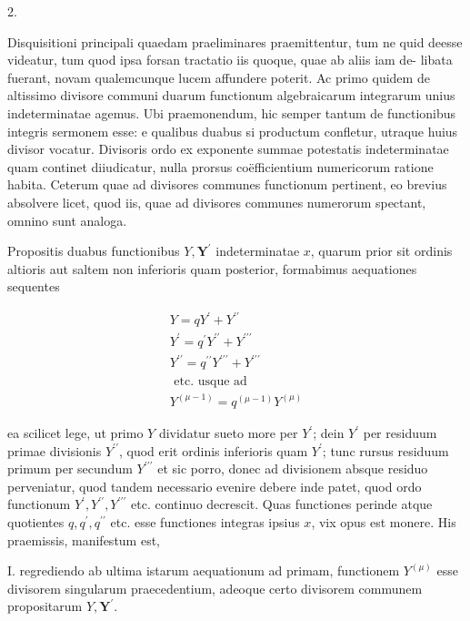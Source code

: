 \documentclass[10pt]{article}
\begin{document}
2.

Disquisitioni principali quaedam praeliminares praemittentur, tum ne quid deesse videatur, tum quod ipsa forsan tractatio iis quoque, quae ab aliis iam de-
libata fuerant, novam qualemcunque lucem affundere poterit. Ac primo quidem de altissimo divisore communi duarum functionum algebraicarum integrarum unius indeterminatae agemus. Ubi praemonendum, hic semper tantum de functionibus integris sermonem esse: e qualibus duabus si productum confletur, utraque huius divisor vocatur. Divisoris ordo ex exponente summae potestatis indeterminatae quam continet diiudicatur, nulla prorsus coëfficientium numericorum ratione habita. Ceterum quae ad divisores communes functionum pertinent, eo brevius absolvere licet, quod iis, quae ad divisores communes numerorum spectant, omnino sunt analoga.

Propositis duabus functionibus \(Y, \boldsymbol{Y}^{\prime}\) indeterminatae \(x\), quarum prior sit ordinis altioris aut saltem non inferioris quam posterior, formabimus aequationes sequentes

\[
\begin{gathered}
Y=q Y^{\prime}+Y^{\prime \prime} \\
Y^{\prime}=q^{\prime} Y^{\prime \prime}+Y^{\prime \prime \prime} \\
Y^{\prime \prime}=q^{\prime \prime} Y^{\prime \prime \prime}+Y^{\prime \prime \prime} \\
\text { etc. usque ad } \\
Y^{(\mu-1)}=q^{(\mu-1)} Y^{(\mu)}
\end{gathered}
\]

ea scilicet lege, ut primo \(Y\) dividatur sueto more per \(Y^{\prime}\); dein \(Y^{\prime}\) per residuum primae divisionis \(Y^{\prime \prime}\), quod erit ordinis inferioris quam \(Y^{\prime}\); tunc rursus residuum primum per secundum \(Y^{\prime \prime \prime}\) et sic porro, donec ad divisionem absque residuo perveniatur, quod tandem necessario evenire debere inde patet, quod ordo functionum \(Y^{\prime}, Y^{\prime \prime}, Y^{\prime \prime \prime}\) etc. continuo decrescit. Quas functiones perinde atque quotientes \(q, q^{\prime}, q^{\prime \prime}\) etc. esse functiones integras ipsius \(x\), vix opus est monere. His praemissis, manifestum est,

I. regrediendo ab ultima istarum aequationum ad primam, functionem \(Y^{(\mu)}\) esse divisorem singularum praecedentium, adeoque certo divisorem communem propositarum \(Y, \boldsymbol{Y}^{\prime}\).
\end{document}
